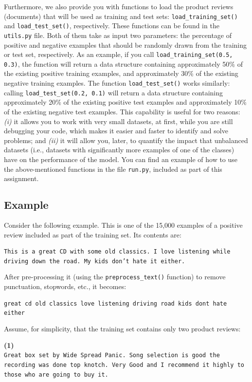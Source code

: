 \documentclass[letterpaper]{article}
\begin{document}
Furthermore, we also provide you with functions to load the product reviews (documents) that will be used as training and test sets: \texttt{load\_training\_set()} and \texttt{load\_test\_set()}, respectively. These functions can be found in the \texttt{utils.py} file. Both of them take as input two parameters: the percentage of positive and negative examples that should be randomly drawn from the training or test set, respectively. As an example, if you call \texttt{load\_training\_set(0.5, 0.3)}, the function will return a data structure containing approximately 50\% of the existing positive training examples, and approximately 30\% of the existing negative training examples. The function \texttt{load\_test\_set()} works similarly: calling \texttt{load\_test\_set(0.2, 0.1)} will return a data structure containing approximately 20\% of the existing positive test examples and approximately 10\% of the existing negative test examples. This capability is useful for two reasons: \textit{(i)} it allows you to work with very small datasets, at first, while you are still debugging your code, which makes it easier and faster to identify and solve problems; and \textit{(ii)} it will allow you, later, to quantify the impact that unbalanced datasets (i.e., datasets with significantly more examples of one of the classes) have on the performance of the model. You can find an example of how to use the above-mentioned functions in the file \texttt{run.py}, included as part of this assignment.

\subsection{Example}

Consider the following example. This is one of the 15,000 examples of a positive review included as part of the training set. Its contents are:

\noindent \texttt{This is a great CD with some old classics. I love listening while driving down the road. My kids don't hate it either.}

\noindent After pre-processing it (using the \texttt{preprocess\_text()} function) to remove punctuation, stopwords, etc., it becomes:

\noindent \texttt{great cd old classics love listening driving road kids dont hate either}

\noindent Assume, for simplicity, that the training set contains only two product reviews:

\noindent \textbf{(1)} \\
\noindent \texttt{Great box set by Wide Spread Panic. Song selection is good the recording was done top knotch. Very Good and I recommend it highly to those who are going to buy it.}
\end{document}
